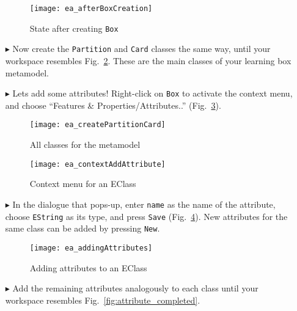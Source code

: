\begin{itemize}
\begin{figure}[htbp]
	\centering
  \texttt{[image: ea\_afterBoxCreation]}
	\caption{State after creating \texttt{Box}}
	\label{fig:eclass_completed}
\end{figure}

\item[$\blacktriangleright$] Now create the \texttt{Partition} and \texttt{Card} classes the same way, until your workspace resembles
Fig.~\ref{fig:all_eclasses}. These are the main classes of your learning box metamodel.

\vspace{0.5cm}

\item[$\blacktriangleright$] Lets add some attributes! Right-click on \texttt{Box} to activate the context menu, and choose ``Features \&
Properties/Attributes..'' (Fig.~\ref{fig:attribute}).

\begin{figure}[htbp]
	\centering
  \texttt{[image: ea\_createPartitionCard]}
	\caption{All classes for the metamodel}
	\label{fig:all_eclasses}
\end{figure}

\begin{figure}[htbp]
	\centering
  \texttt{[image: ea\_contextAddAttribute]}
	\caption{Context menu for an EClass}
	\label{fig:attribute}
\end{figure}
\FloatBarrier

\item[$\blacktriangleright$] In the dialogue that pops-up, enter \texttt{name} as the name of the attribute, choose \texttt{EString} as its type, and press
\texttt{Save} (Fig.~\ref{fig:attribute_properties}). New attributes for the same class can be added by pressing \texttt{New}.

\vspace{1.0cm}

\begin{figure}[htbp]
	\centering
  \texttt{[image: ea\_addingAttributes]}
	\caption{Adding attributes to an EClass}
	\label{fig:attribute_properties}
\end{figure}

\vspace{0.5cm}

\item[$\blacktriangleright$] Add the remaining attributes analogously to each class until your workspace resembles Fig.~\ref{fig:attribute_completed}.


\end{itemize}
